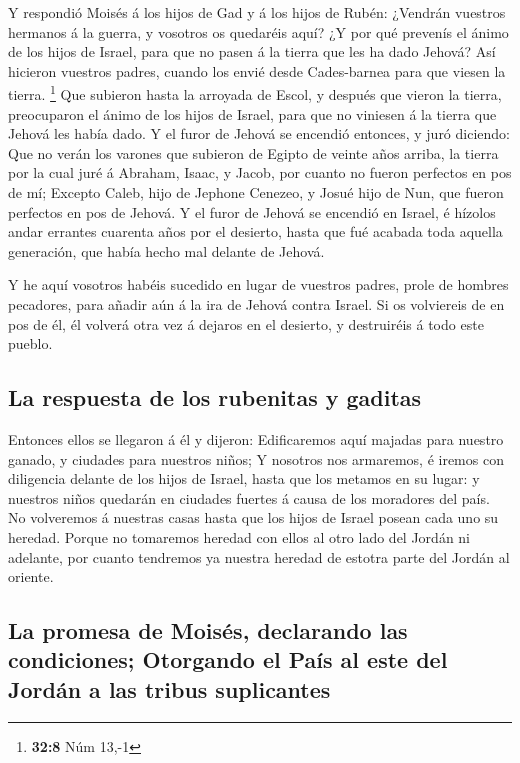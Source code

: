  Y respondió Moisés á los hijos de Gad y á los hijos de
Rubén: ¿Vendrán vuestros hermanos á la guerra, y vosotros os quedaréis
aquí?  ¿Y por qué prevenís el ánimo de los hijos de
Israel, para que no pasen á la tierra que les ha dado Jehová?
 Así hicieron vuestros padres, cuando los envié desde
Cades-barnea para que viesen la tierra. \footnote{\textbf{32:8} Núm
  13,-1}  Que subieron hasta la arroyada de Escol, y
después que vieron la tierra, preocuparon el ánimo de los hijos de
Israel, para que no viniesen á la tierra que Jehová les había dado.
 Y el furor de Jehová se encendió entonces, y juró
diciendo:  Que no verán los varones que subieron de
Egipto de veinte años arriba, la tierra por la cual juré á Abraham,
Isaac, y Jacob, por cuanto no fueron perfectos en pos de mí;
 Excepto Caleb, hijo de Jephone Cenezeo, y Josué hijo de
Nun, que fueron perfectos en pos de Jehová.  Y el furor
de Jehová se encendió en Israel, é hízolos andar errantes cuarenta años
por el desierto, hasta que fué acabada toda aquella generación, que
había hecho mal delante de Jehová.

 Y he aquí vosotros habéis sucedido en lugar de vuestros
padres, prole de hombres pecadores, para añadir aún á la ira de Jehová
contra Israel.  Si os volviereis de en pos de él, él
volverá otra vez á dejaros en el desierto, y destruiréis á todo este
pueblo.

\hypertarget{la-respuesta-de-los-rubenitas-y-gaditas}{%
\subsection{La respuesta de los rubenitas y
gaditas}\label{la-respuesta-de-los-rubenitas-y-gaditas}}

 Entonces ellos se llegaron á él y dijeron: Edificaremos
aquí majadas para nuestro ganado, y ciudades para nuestros niños;
 Y nosotros nos armaremos, é iremos con diligencia
delante de los hijos de Israel, hasta que los metamos en su lugar: y
nuestros niños quedarán en ciudades fuertes á causa de los moradores del
país.  No volveremos á nuestras casas hasta que los hijos
de Israel posean cada uno su heredad.  Porque no
tomaremos heredad con ellos al otro lado del Jordán ni adelante, por
cuanto tendremos ya nuestra heredad de estotra parte del Jordán al
oriente.

\hypertarget{la-promesa-de-moisuxe9s-declarando-las-condiciones-otorgando-el-pauxeds-al-este-del-jorduxe1n-a-las-tribus-suplicantes}{%
\subsection{La promesa de Moisés, declarando las condiciones; Otorgando
el País al este del Jordán a las tribus
suplicantes}\label{la-promesa-de-moisuxe9s-declarando-las-condiciones-otorgando-el-pauxeds-al-este-del-jorduxe1n-a-las-tribus-suplicantes}}

